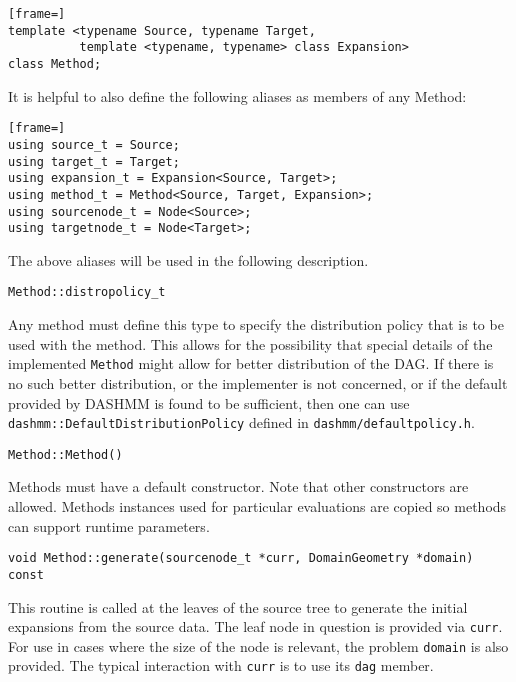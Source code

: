 \begin{lstlisting}[frame=]
template <typename Source, typename Target,
          template <typename, typename> class Expansion>
class Method;
\end{lstlisting}

\noindent It is helpful to also define the following aliases as members of
any Method:

\begin{lstlisting}[frame=]
using source_t = Source;
using target_t = Target;
using expansion_t = Expansion<Source, Target>;
using method_t = Method<Source, Target, Expansion>;
using sourcenode_t = Node<Source>;
using targetnode_t = Node<Target>;
\end{lstlisting}

\noindent The above aliases will be used in the following description.

\begin{lstlisting}
Method::distropolicy_t
\end{lstlisting}

\noindent
Any method must define this type to specify the distribution policy that is to
be used with the method. This allows for the possibility that special details
of the implemented \texttt{Method} might allow for better distribution of the
DAG. If there is no such better distribution, or the implementer is not
concerned, or if the default provided by DASHMM is found to be sufficient, then
one can use \texttt{dashmm::DefaultDistributionPolicy} defined in
\texttt{dashmm/defaultpolicy.h}.

\begin{lstlisting}
Method::Method()
\end{lstlisting}

\noindent
Methods must have a default constructor. Note that other constructors are
allowed. Methods instances used for particular evaluations are copied so
methods can support runtime parameters.

\begin{lstlisting}
void Method::generate(sourcenode_t *curr, DomainGeometry *domain) const
\end{lstlisting}

\noindent
This routine is called at the leaves of the source tree to generate the initial
expansions from the source data. The leaf node in question is provided via
\texttt{curr}. For use in cases where the size of the node is relevant,
the problem \texttt{domain} is also provided. The typical interaction with
\texttt{curr} is to use its \texttt{dag} member.

